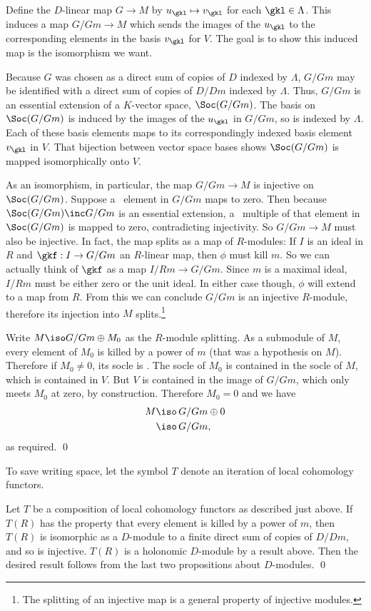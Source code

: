 Define the $D$-linear map $G\to M$ by $u_{\gkl}\mapsto v_{\gkl}$ for each $\gkl\in\Lambda$.  This induces a map $G/Gm\to M$ which sends the images of the $u_{\gkl}$ to the corresponding elements in the basis $v_{\gkl}$ for $V$.  The goal is to show this induced map is the isomorphism we want.

Because $G$ was chosen as a direct sum of copies of $D$ indexed by $\Lambda$, $G/Gm$ may be identified with a direct sum of copies of $D/Dm$ indexed by $\Lambda$. Thus, $G/Gm$ is an essential extension of a $K$-vector space, $\Soc(G/Gm)$.  The basis on $\Soc(G/Gm)$ is induced by the images of the $u_{\gkl}$ in $G/Gm$, so is indexed by $\Lambda$.  Each of these basis elements maps to its correspondingly indexed basis element $v_{\gkl}$ in $V$.  That bijection between vector space bases shows $\Soc(G/Gm)$ is mapped isomorphically onto $V$.  

As an isomorphism, in particular, the map $G/Gm\to M$ is injective on $\Soc(G/Gm)$.  Suppose a \nz\ element in $G/Gm$ maps to zero.  Then because $\Soc(G/Gm)\inc G/Gm$ is an essential extension, a \nz\ multiple of that element in $\Soc(G/Gm)$ is mapped to zero, contradicting injectivity.  So $G/Gm\to M$ must also be injective.  In fact, the map splits as a map of $R$-modules:  If $I$ is an ideal in $R$ and $\gkf:I\to G/Gm$ an $R$-linear map, then $\phi$ must kill $m$.  So we can actually think of $\gkf$ as a map $I/Rm\to G/Gm$.  Since $m$ is a maximal ideal, $I/Rm$ must be either zero or the unit ideal.  In either case though, $\phi$ will extend to a map from $R$.  From this we can conclude $G/Gm$ is an injective $R$-module, therefore its injection into $M$ splits.\footnote{The splitting of an injective map is a general property of injective modules.}  

Write $M\iso G/Gm\oplus M_0$ as the $R$-module splitting.  As a submodule of $M$, every element of $M_0$ is killed by a power of $m$ (that was a hypothesis on $M$).  Therefore if $M_0\neq 0$, its socle is \nz.  The socle of $M_0$ is contained in the socle of $M$, which is contained in $V$.  But $V$ is contained in the image of $G/Gm$, which only meets $M_0$ at zero, by construction.  Therefore $M_0=0$ and we have 
$$\aligned M\iso\,& G/Gm\oplus 0 \\
\iso\,& G/Gm,
\endaligned$$
as required. \qed

\demo{\Not} To save writing space, let the symbol $T$ denote an iteration of local cohomology functors. \enddemo

\proclaim{\Cor} Let $T$ be a composition of local cohomology functors as described just above. If $T(R)$ has the property that every element is killed by a power of $m$, then $T(R)$ is isomorphic as a $D$-module to a finite direct sum of copies of $D/Dm$, and so is injective. \endproclaim
\pf $T(R)$ is a holonomic $D$-module by a result above.  Then the desired result follows from the last two propositions about $D$-modules.  \qed 

